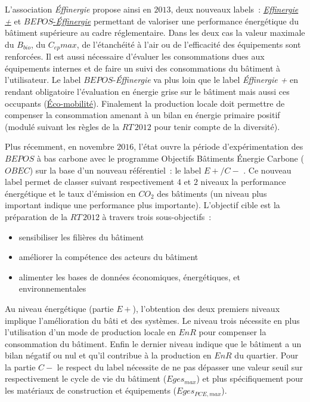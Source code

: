 L’association \textit{Éffinergie} propose ainsi en $2013$, deux nouveaux labels~:
\href{https://www.effinergie.org/web/index.php/les-labels-effinergie/le-label-effinergie-plus}{\textit{Effinergie +}}
et \href{https://www.effinergie.org/web/index.php/les-labels-effinergie/bepos-effinergie}{$BEPOS$-\textit{Éffinergie}}
permettant de valoriser une performance énergétique du bâtiment
supérieure au cadre réglementaire. Dans les deux cas la valeur maximale du $B_{bio}$,
du $C_{ep} max$, de l’étanchéité à l’air ou de l’efficacité des équipements sont renforcées.
Il est aussi nécessaire d’évaluer les consommations dues aux équipements internes
et de faire un suivi des consommations du bâtiment à l’utilisateur.
Le label $BEPOS$-\textit{Éffinergie} va plus loin que le label \textit{Éffinergie +} en rendant
obligatoire l’évaluation en énergie grise sur le bâtiment mais aussi ces occupants
(\href{https://www.effinergie.org/web/index.php/effinergie-ecomobilite}{Éco-mobilité}).
Finalement la production locale doit permettre de compenser la consommation amenant à
un bilan en énergie primaire positif (modulé suivant les règles de la $RT\,2012$
pour tenir compte de la diversité).


Plus récemment, en novembre $2016$, l’état ouvre la période d’expérimentation des $BEPOS$ à
bas carbone avec le programme Objectifs Bâtiments Énergie Carbone ($OBEC$) sur la base d’un
nouveau référentiel~: le label $E+/C-$ \parencite{Ministere2016}. Ce nouveau label permet de classer suivant
respectivement $4$ et $2$ niveaux la performance énergétique et le taux d’émission en $CO_{2}$
des bâtiments (un niveau plus important indique une performance plus importante). L’objectif
cible est la préparation de la $RT\,2012$ à travers trois sous-objectifs~:
\begin{itemize}
    \item sensibiliser les filières du bâtiment
    \item améliorer la compétence des acteurs du bâtiment
    \item alimenter les bases de données économiques, énergétiques, et environnementales
\end{itemize}
Au niveau énergétique (partie $E+$), l’obtention des deux premiers niveaux implique l’amélioration
du bâti et des systèmes. Le niveau trois nécessite en plus l’utilisation d’un mode
de production locale en $EnR$ pour compenser la consommation du bâtiment. Enfin le dernier
niveau indique que le bâtiment a un bilan négatif ou nul et qu’il contribue à la
production en $EnR$ du quartier. Pour la partie $C-$ le respect du label nécessite
de ne pas dépasser une valeur seuil sur respectivement le cycle de vie du bâtiment
($Eges_{max}$) et plus spécifiquement pour les matériaux de construction et équipements ($Eges_{PCE, max}$).

